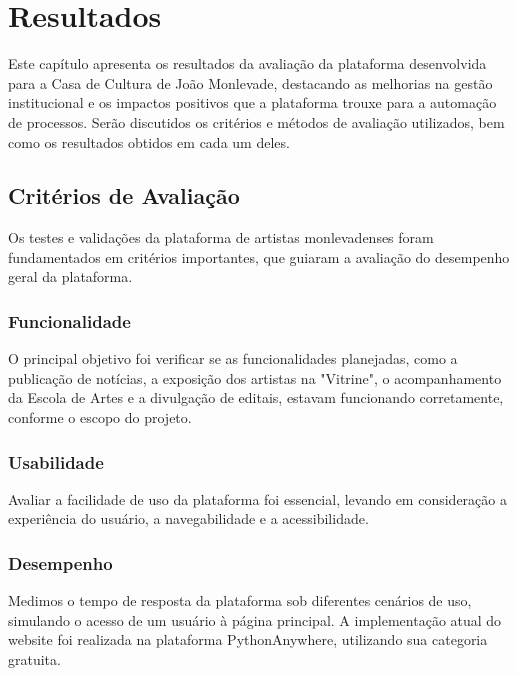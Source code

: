 \chapter{Resultados}
\label{cap:resultados}

Este capítulo apresenta os resultados da avaliação da plataforma desenvolvida para a Casa de Cultura de João Monlevade, destacando as melhorias na gestão institucional e os impactos positivos que a plataforma trouxe para a automação de processos. Serão discutidos os critérios e métodos de avaliação utilizados, bem como os resultados obtidos em cada um deles.

\section{Critérios de Avaliação}

Os testes e validações da plataforma de artistas monlevadenses foram fundamentados em critérios importantes, que guiaram a avaliação do desempenho geral da plataforma.

\subsection{Funcionalidade} 

O principal objetivo foi verificar se as funcionalidades planejadas, como a publicação de notícias, a exposição dos artistas na "Vitrine", o acompanhamento da Escola de Artes e a divulgação de editais, estavam funcionando corretamente, conforme o escopo do projeto. 

\subsection{Usabilidade} 

Avaliar a facilidade de uso da plataforma foi essencial, levando em consideração a experiência do usuário, a navegabilidade e a acessibilidade. 

\subsection{Desempenho} 

Medimos o tempo de resposta da plataforma sob diferentes cenários de uso, simulando o acesso de um usuário à página principal. A implementação atual do website foi realizada na plataforma PythonAnywhere, utilizando sua categoria gratuita. 

